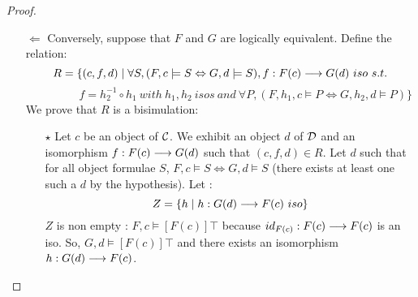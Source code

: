 \begin{proof}
\begin{itemize}
	\item[$\Leftarrow$] Conversely, suppose that $F$ and $G$ are logically equivalent. Define the relation:
	$$R = \{(c,f,d) \mid \forall S, (F,c \models S \Leftrightarrow G,d \models S), f : F(c) \longrightarrow G(d) ~ iso ~ s.t.$$
	$$~~~~~~~~~~~~~~~~~~~~f = h_2^{-1}\circ h_1 ~ with ~ h_1, h_2 ~ isos ~ and ~ \forall P, (F,h_1,c \models P \Leftrightarrow G,h_2,d \models P)\}$$
	We prove that $R$ is a bisimulation:
	\begin{itemize}
		\item[$\star$] Let $c$ be an object of $\mathcal{C}$. We exhibit an object $d$ of $\mathcal{D}$ and an isomorphism $f : F(c) \longrightarrow G(d)$ such that $(c,f,d) \in R$. Let $d$ such that for all object formulae $S$, $F,c \models S \Leftrightarrow G,d \models S$ (there exists at least one such a $d$ by the hypothesis). Let :
		$$Z = \{h \mid h : G(d) \longrightarrow F(c) ~ iso\}$$
		$Z$ is non empty : $F,c \models [F(c)]\top$ because $id_{F(c)} : F(c) \longrightarrow F(c)$ is an iso. So, $G,d \models [F(c)]\top$ and there exists an isomorphism $h : G(d) \longrightarrow F(c)$.
		

\end{itemize}
\end{itemize}
\end{proof}
